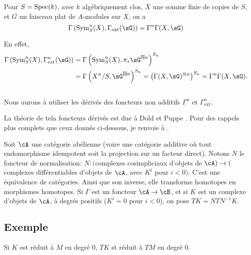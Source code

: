 \begin{lemma_}\label{III:1-3}
Pour $S=\operatorname{Spec}(k)$, avec $k$ algébriquement clos, $X$ une somme finie de 
copies de $S$, et $G$ un faisceau plat de $A$-modules sur $X$, on a 
\[
  \Gamma\left(\operatorname{Sym}_S^n(X),\Gamma_\text{ext}(\sG)\right) = \Gamma^n \Gamma(X,\sG)
\]
\end{lemma_}

En effet, 
\begin{align*}
  \Gamma\left(\operatorname{Sym}_S^n(X),\Gamma_\text{ext}^n(\sG)\right) 
    &= \Gamma\left(\operatorname{Sym}_S^n(X),\pi_*\sG^{\boxtimes n}\right)^{S_n} \\
    &= \Gamma\left(X^n/S,\sG^{\boxtimes n}\right)^{S_n} 
    = \left(\Gamma(X,\sG)^{\otimes n}\right)^{S_n} 
    = \Gamma^n \Gamma(X,\sG) \text{.}
\end{align*}





\subsection{}\label{III:1-4}

Nous aurons à utiliser les dérivés des foncteurs non additifs $\Gamma^n$ 
et $\Gamma_\text{ext}^n$. 

La théorie de tela foncteurs dérivés est due à Dold et Puppe 
\cite{do61}. Pour des rappels plus complets que ceux donnés ci-dessous, je 
renvoie à \cite[XVII 5.5.3]{sga4}. 

Soit $\cA$ une catégorie abélienne (voire une catégorie additive où 
tout endomorphisme idempotent soit la projection sur un facteur direct). Notons 
$N$ le foncteur de normalisation: $N:($complexes cosimpliciaux d'objets de 
$\cA)\to($complexes différentiables d'objets de $\cA$, avec $K^i$ pour 
$i<0)$. C'est une équivalence de catégories. Ainsi que son inverse, elle 
transforme homotopes en morphismes homotopes. Si $\Gamma$ est un foncteur 
$\cA\to\cB$, et si $K$ est un complexe d'objets de $\cA$, à degrés 
positifs ($K^i=0$ pour $i<0$), on pose $T K=N T N^{-1} K$. 





\subsection{Exemple}\label{III:1-5}

Si $K$ est réduit à $M$ en degré $0$, $T K$ st réduit à $T M$ en 
degré $0$. 





